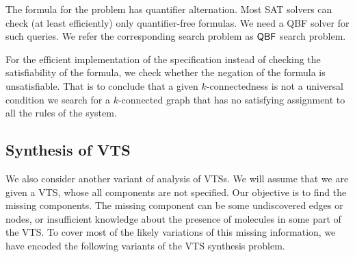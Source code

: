 %
 
The formula for the problem has quantifier alternation. 
%
Most SAT solvers can check (at least efficiently) only quantifier-free formulas.
%
%
We need a QBF solver for such queries. 
%
We refer the corresponding search problem as $\mathsf{QBF}$ search problem.
%

For the efficient implementation of the specification instead of checking the satisfiability of the formula, we check whether the negation of the formula is unsatisfiable. 
%
That is to conclude that a given $k$-connectedness is not a universal condition we search for a $k$-connected graph that has no satisfying assignment to all the rules of the system.
%

%

\subsection{Synthesis of VTS}
%
\noindent We also consider another variant of analysis of VTSs.
%
We will assume that we are given a VTS, whose all components
are not specified.
%
Our objective is to find the missing components.
%
The missing component can
%
be some undiscovered edges or nodes, or insufficient
knowledge about the presence of molecules in some part of the VTS.
%
To cover most of the likely variations of this missing information,
we have encoded the following variants of the VTS synthesis problem.

